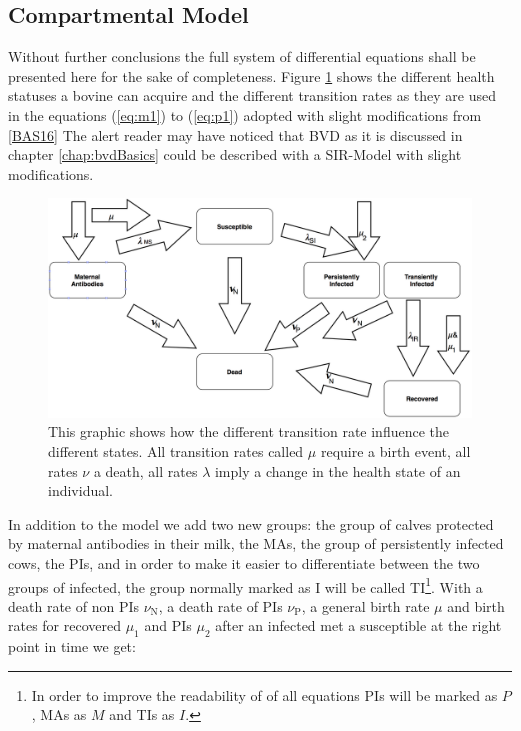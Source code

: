 \subsection{Compartmental Model}
Without further conclusions the full system of differential equations shall be presented here for the sake of completeness. Figure \ref{fig:bvdDia} shows the different health statuses a bovine can acquire and the different transition rates as they are used in the equations (\ref{eq:m1}) to (\ref{eq:p1}) adopted with slight modifications from \ref{BAS16}
The alert reader may have noticed that BVD as it is discussed in chapter \ref{chap:bvdBasics} could be described with a SIR-Model with slight modifications. 
\begin{figure}[htbp]
\centering
\noindent\includegraphics[width=\linewidth,height=\textheight,
keepaspectratio]{bvdDia.png} \caption[BVD Disease Spread Illustration]{This graphic shows how the different transition rate influence the different states. All transition rates called $\mu$ require a birth event, all rates $\nu$ a death, all rates $\lambda$ imply a change in the health state of an individual.}
\label{fig:bvdDia}
\end{figure}
In addition to the model we add two new groups: the group of calves protected by maternal antibodies in their milk, the MAs, the group of persistently infected cows, the PIs, and in order to make it easier to differentiate between the two groups of infected, the group normally marked as I will be called TI\footnote{In order to improve the readability of of all equations PIs will be marked as $P$, MAs as $M$ and TIs as $I$.}.
With a death rate of non PIs $\nu_\text{N}$, a death rate of PIs $\nu_\text{P}$, a general birth rate $\mu$ and birth rates for recovered $\mu_1$ and PIs $\mu_2$ after an infected met a susceptible at the right point in time we get:

